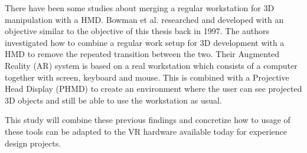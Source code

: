 There have been some studies about merging a regular workstation for 3D manipulation with a HMD\cite{UX:Alger2015}\cite{relatedwork:kijimaand1997transition}. Bowman et al. researched and developed with an objective similar to the objective of this thesis back in 1997\cite{relatedwork:kijimaand1997transition}. The authors investigated how to combine a regular work setup for 3D development with a HMD to remove the repeated transition between the two. Their Augmented Reality (AR) system is based on a real workstation which consists of a computer together with screen, keyboard and mouse. This is combined with a Projective Head Display (PHMD) to create an environment where the user can see projected 3D objects and still be able to use the workstation as usual.

This study will combine these previous findings and concretize how to usage of these tools can be adapted to the VR hardware available today for experience design projects.
